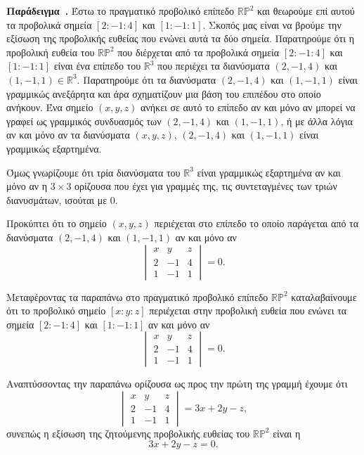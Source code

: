 \documentclass[12pt, a4paper]{book}
\newcounter{example}[section]
\newenvironment{example}[1][]{\refstepcounter{example}\par\medskip
   \textbf{Παράδειγμα~\theexample. #1} \rmfamily}{\medskip}
\begin{document}
\begin{example}
Έστω το πραγματικό προβολικό επίπεδο $\mathbb{R}\mathbb{P}^2$ και θεωρούμε επί αυτού τα προβολικά σημεία $[2:-1:4]$ και $[1:-1:1]$. Σκοπός μας είναι να βρούμε την εξίσωση της προβολικής ευθείας που ενώνει αυτά τα δύο σημεία.
Παρατηρούμε ότι η προβολική ευθεία του $\mathbb{R}\mathbb{P}^2$ που διέρχεται από τα προβολικά σημεία $[2:-1:4]$ και $[1:-1:1]$ είναι ένα επίπεδο του $\mathbb{R}^3$ που περιέχει τα διανύσματα $(2,-1,4)$ και $(1,-1,1) \in \mathbb{R}^3$. Παρατηρούμε ότι τα διανύσματα $(2,-1,4)$ και $(1,-1,1)$ είναι γραμμικώς ανεξάρητα και άρα σχηματίζουν μια βάση του επιπέδου στο οποίο ανήκουν. Ένα σημείο $(x,y,z)$ ανήκει σε αυτό το επίπεδο αν και μόνο αν μπορεί να γραφεί ως γραμμικός συνδυασμός των $(2,-1,4)$ και $(1,-1,1)$, ή με άλλα λόγια αν και μόνο αν τα διανύσματα $(x,y,z)$, $(2,-1,4)$ και $(1,-1,1)$ είναι γραμμικώς εξαρτημένα.

Όμως γνωρίζουμε ότι τρία διανύσματα του $\mathbb{R}^3$ είναι γραμμικώς εξαρτημένα αν και μόνο αν η $3 \times 3 $ ορίζουσα που έχει για γραμμές της, τις συντεταγμένες των τριών διανυσμάτων, ισούται με $0$.

Προκύπτει ότι το σημείο $(x,y,z)$ περιέχεται στο επίπεδο το οποίο παράγεται από τα διανύσματα $(2,-1,4)$ και $(1,-1,1)$ αν και μόνο αν 
\begin{displaymath}
\begin{vmatrix}
x&y&z \\ 2&-1&4 \\ 1&-1&1
\end{vmatrix} = 0.
\end{displaymath}

Μεταφέροντας τα παραπάνω στο πραγματικό προβολικό επίπεδο $\mathbb{R}\mathbb{P}^2$ καταλαβαίνουμε ότι το προβολικό σημείο $[x:y:z]$ περιέχεται στην προβολική ευθεία που ενώνει τα σημεία $[2:-1:4]$ και $[1:-1:1]$ αν και μόνο αν
\begin{displaymath}
\begin{vmatrix}
x&y&z \\ 2&-1&4 \\ 1&-1&1
\end{vmatrix} = 0.
\end{displaymath}

Αναπτύσσοντας την παραπάνω ορίζουσα ως προς την πρώτη της γραμμή έχουμε ότι 
\begin{displaymath}
\begin{vmatrix}
x&y&z \\ 2&-1&4 \\ 1&-1&1
\end{vmatrix} = 3x+2y-z,
\end{displaymath}
συνεπώς η εξίσωση της ζητούμενης προβολικής ευθείας του $\mathbb{R}\mathbb{P}^2$ είναι η
\begin{displaymath}
3x+2y-z = 0.
\end{displaymath}
\end{example}
\end{document}
